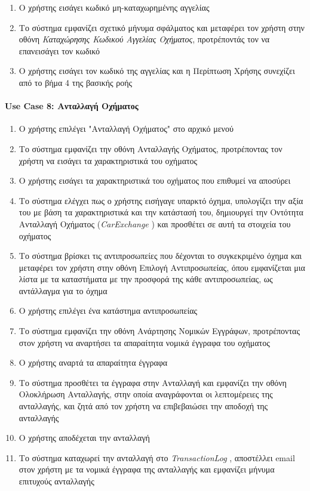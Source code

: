 \documentclass{../ol-softwaremanual}
\begin{document}
	\begin{enumerate}
		\item Ο χρήστης εισάγει κωδικό μη-καταχωρημένης αγγελίας
		\item Το σύστημα εμφανίζει σχετικό μήνυμα σφάλματος και μεταφέρει τον χρήστη στην οθόνη \textit{Καταχώρησης Κωδικού Αγγελίας Οχήματος}, προτρέποντάς τον να επανεισάγει τον κωδικό
		\item Ο χρήστης εισάγει τον κωδικό της αγγελίας και η Περίπτωση Χρήσης συνεχίζει από το βήμα 4 της βασικής ροής
	\end{enumerate}
	
	
	\paragraph{\en Use Case 8: \gr  Ανταλλαγή Οχήματος \gr}
	
	\begin{enumerate}
		\item Ο χρήστης επιλέγει \en"\gr Ανταλλαγή Οχήματος\en" \gr στο αρχικό μενού
		\item Το σύστημα εμφανίζει την οθόνη Ανταλλαγής Οχήματος, προτρέποντας τον χρήστη να εισάγει τα χαρακτηριστικά του οχήματος 
		\item Ο χρήστης εισάγει τα χαρακτηριστικά του οχήματος που επιθυμεί να αποσύρει
		\item Το σύστημα ελέγχει πως ο χρήστης εισήγαγε υπαρκτό όχημα, υπολογίζει την αξία του με βάση τα χαρακτηριστικά και την κατάστασή του, δημιουργεί την Οντότητα Ανταλλαγή Οχήματος (\en \textit{CarExchange} \gr) και προσθέτει σε αυτή τα στοιχεία του οχήματος
		\item Το σύστημα βρίσκει τις αντιπροσωπείες που δέχονται το συγκεκριμένο όχημα και μεταφέρει τον χρήστη στην οθόνη Επιλογή Αντιπροσωπείας, όπου εμφανίζεται μια λίστα με τα καταστήματα με την προσφορά της κάθε αντιπροσωπείας, ως αντάλλαγμα για το όχημα
		\item Ο χρήστης επιλέγει ένα κατάστημα αντιπροσωπείας
		\item Το σύστημα εμφανίζει την οθόνη Ανάρτησης Νομικών Εγγράφων, προτρέποντας στον χρήστη να αναρτήσει τα απαραίτητα νομικά έγγραφα του οχήματος
		\item Ο χρήστης αναρτά τα απαραίτητα έγγραφα		
		\item Το σύστημα προσθέτει τα έγγραφα στην Ανταλλαγή και εμφανίζει την οθόνη Ολοκλήρωση Ανταλλαγής, στην οποία αναγράφονται οι λεπτομέρειες της ανταλλαγής, και ζητά από τον χρήστη να επιβεβαιώσει την αποδοχή της ανταλλαγής
		\item Ο χρήστης αποδέχεται την ανταλλαγή
		\item Το σύστημα καταχωρεί την ανταλλαγή στο \en \textit{TransactionLog} \gr, αποστέλλει \en email \gr στον χρήστη με τα νομικά έγγραφα της ανταλλαγής και εμφανίζει μήνυμα επιτυχούς ανταλλαγής		
	\end{enumerate}
	
\end{document}
